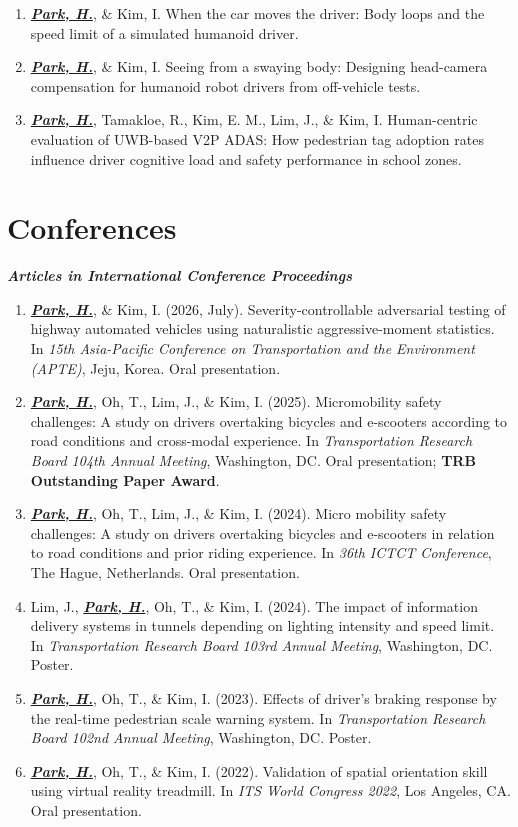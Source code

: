 \documentclass[12pt]{article}
\newlength{\blockgap}\setlength{\blockgap}{14pt}
\newcommand{\subhead}[1]{\par\vspace{\blockgap}{\fontsize{13pt}{15.5pt}\selectfont\bfseries\itshape #1}\par\vspace{6pt}}
\newcommand{\firstsubhead}[1]{\par{\fontsize{13pt}{15.5pt}\selectfont\bfseries\itshape #1}\par\vspace{6pt}}
\newcommand{\me}{\textbf{\textit{\uline{Park, H.}}}}
\begin{document}
\subhead{Manuscripts in Preparation}
\begin{enumerate}
\item \me, \& Kim, I. When the car moves the driver: Body loops and the speed limit of a simulated humanoid driver.
\item \me, \& Kim, I. Seeing from a swaying body: Designing head-camera compensation for humanoid robot drivers from off-vehicle tests.
\item \me, Tamakloe, R., Kim, E. M., Lim, J., \& Kim, I. Human-centric evaluation of UWB-based V2P ADAS: How pedestrian tag adoption rates influence driver cognitive load and safety performance in school zones.
\end{enumerate}

\section*{Conferences}
\firstsubhead{Articles in International Conference Proceedings}
\begin{enumerate}
\item \me, \& Kim, I. (2026, July). Severity-controllable adversarial testing of highway automated vehicles using naturalistic aggressive-moment statistics. In \textit{15th Asia-Pacific Conference on Transportation and the Environment (APTE)}, Jeju, Korea. Oral presentation.
\item \me, Oh, T., Lim, J., \& Kim, I. (2025). Micromobility safety challenges: A study on drivers overtaking bicycles and e-scooters according to road conditions and cross-modal experience. In \textit{Transportation Research Board 104th Annual Meeting}, Washington, DC. Oral presentation; \textbf{TRB Outstanding Paper Award}.
\item \me, Oh, T., Lim, J., \& Kim, I. (2024). Micro mobility safety challenges: A study on drivers overtaking bicycles and e-scooters in relation to road conditions and prior riding experience. In \textit{36th ICTCT Conference}, The Hague, Netherlands. Oral presentation.
\item Lim, J., \me, Oh, T., \& Kim, I. (2024). The impact of information delivery systems in tunnels depending on lighting intensity and speed limit. In \textit{Transportation Research Board 103rd Annual Meeting}, Washington, DC. Poster.
\item \me, Oh, T., \& Kim, I. (2023). Effects of driver's braking response by the real-time pedestrian scale warning system. In \textit{Transportation Research Board 102nd Annual Meeting}, Washington, DC. Poster.
\item \me, Oh, T., \& Kim, I. (2022). Validation of spatial orientation skill using virtual reality treadmill. In \textit{ITS World Congress 2022}, Los Angeles, CA. Oral presentation.
\end{enumerate}
\end{document}
